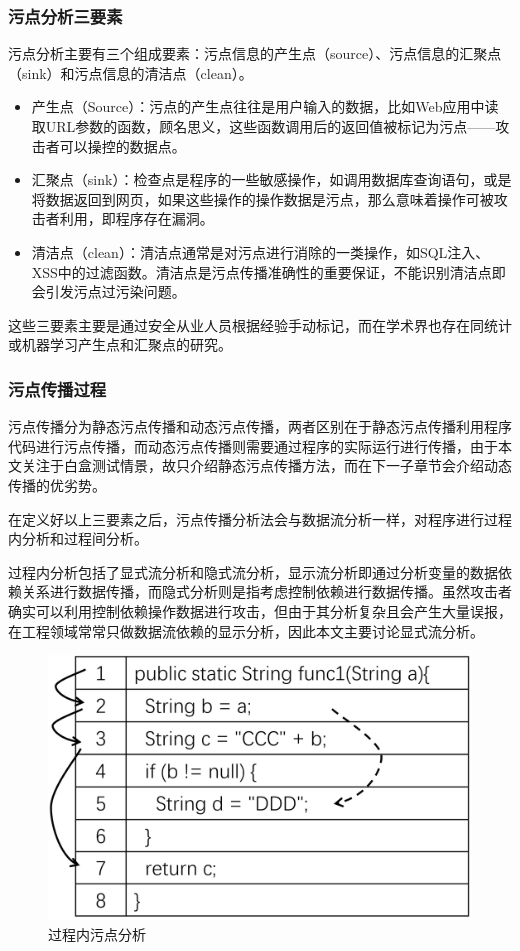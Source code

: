 \subsubsection{污点分析三要素}
污点分析主要有三个组成要素：污点信息的产生点（source）、污点信息的汇聚点（sink）和污点信息的清洁点（clean）。

\begin{itemize}
	\item 产生点（Source）：污点的产生点往往是用户输入的数据，比如Web应用中读取URL参数的函数，顾名思义，这些函数调用后的返回值被标记为污点——攻击者可以操控的数据点。
	\item 汇聚点（sink）：检查点是程序的一些敏感操作，如调用数据库查询语句，或是将数据返回到网页，如果这些操作的操作数据是污点，那么意味着操作可被攻击者利用，即程序存在漏洞。
	\item 清洁点（clean）：清洁点通常是对污点进行消除的一类操作，如SQL注入、XSS中的过滤函数。清洁点是污点传播准确性的重要保证，不能识别清洁点即会引发污点过污染问题。
\end{itemize}
这些三要素主要是通过安全从业人员根据经验手动标记，而在学术界也存在同统计或机器学习产生点和汇聚点的研究。\\

\subsubsection{污点传播过程}
污点传播分为静态污点传播和动态污点传播，两者区别在于静态污点传播利用程序代码进行污点传播，而动态污点传播则需要通过程序的实际运行进行传播，由于本文关注于白盒测试情景，故只介绍静态污点传播方法，而在下一子章节会介绍动态传播的优劣势。

在定义好以上三要素之后，污点传播分析法会与数据流分析一样，对程序进行过程内分析和过程间分析。

过程内分析包括了显式流分析和隐式流分析，显示流分析即通过分析变量的数据依赖关系进行数据传播，而隐式分析则是指考虑控制依赖进行数据传播。虽然攻击者确实可以利用控制依赖操作数据进行攻击，但由于其分析复杂且会产生大量误报，在工程领域常常只做数据流依赖的显示分析，因此本文主要讨论显式流分析。

\begin{figure}[htb]
	\centering
	\includegraphics[width=0.5\linewidth]{FIGs/chapter2/internal_taintflow.png}
	\caption{过程内污点分析}\label{internalflow}
\end{figure}

